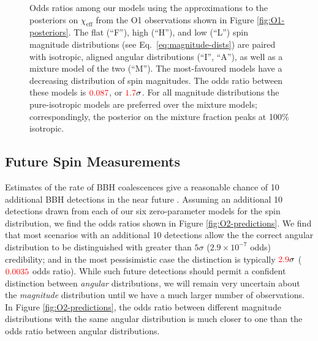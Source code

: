 \documentclass[modern,linenumbers]{aastex61}
\newcommand{\chieff}{\chi_\mathrm{eff}}
\newcommand{\checkme}[1]{\textcolor{red}{#1}}
\newcommand{\OOneSigmaIsoAligned}{\checkme{1.7}}
\newcommand{\OOneOddsIsoAligned}{\checkme{0.087}}
\newcommand{\OTwoSigmaIsoAlignedMin}{\checkme{2.9}}
\newcommand{\OTwoOddsIsoAlignedMin}{\checkme{0.0035}}
\begin{document}
\begin{figure}
  \caption{Odds ratios among our models using the approximations to
    the posteriors on $\chieff$ from the O1 observations shown in
    Figure \ref{fig:O1-posteriors}.  The flat (``F''), high (``H''),
    and low (``L'') spin magnitude distributions (see Eq.\
    \eqref{eq:magnitude-dists}) are paired with isotropic, aligned
    angular distributions (``$\mathrm{I}$'', ``$\mathrm{A}$''), as
    well as a mixture model of the two (``$\mathrm{M}$'').  The
    most-favoured models have a decreasing distribution of spin
    magnitudes.  The odds ratio between these models is
    $\OOneOddsIsoAligned$, or $\OOneSigmaIsoAligned\sigma$.  For all
    magnitude distributions the pure-isotropic models are preferred
    over the mixture models; correspondingly, the posterior on the
    mixture fraction peaks at 100\% isotropic.}
  \label{fig:O1-odds}
\end{figure}

\subsection{Future Spin Measurements}
\label{subsec:future}

Estimates of the rate of \ac{BBH} coalescences give a reasonable
chance of 10 additional \ac{BBH} detections in the near future
\citep{O1-BBH,2016ApJ...833L...1A,2016ApJS..227...14A}.  Assuming an
additional 10 detections drawn from each of our six zero-parameter
models for the spin distribution, we find the odds ratios shown in
Figure \ref{fig:O2-predictions}.  We find that most scenarios with an
additional 10 detections allow the the correct angular distribution to
be distinguished with greater than $5\sigma$ ($2.9 \times 10^{-7}$
odds) credibility; and in the most pessisimistic case the distinction
is typically $\OTwoSigmaIsoAlignedMin\sigma$ ($\OTwoOddsIsoAlignedMin$
odds ratio).  While such future detections should permit a confident
distinction between \emph{angular} distributions, we will remain very
uncertain about the \emph{magnitude} distribution until we have a much
larger number of observations.  In Figure \ref{fig:O2-predictions},
the odds ratio between different magnitude distributions with the same
angular distribution is much closer to one than the odds ratio between
angular distributions.
\end{document}
